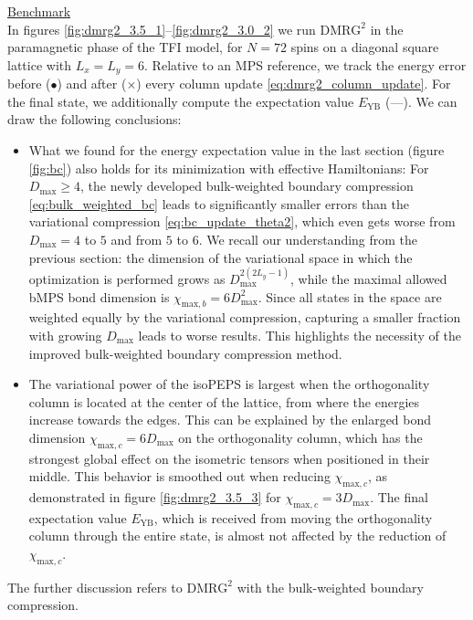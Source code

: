 \noindent \underline{Benchmark} \\[0.5em]
In figures \ref{fig:dmrg2_3.5_1}--\ref{fig:dmrg2_3.0_2} we run $\text{DMRG}^2$ in the paramagnetic phase of the TFI model, for $N = 72$ spins on a diagonal square lattice with $L_x = L_y = 6$. Relative to an MPS reference, we track the energy error before ($\bullet$) and after ($\times$) every column update \eqref{eq:dmrg2_column_update}. For the final state, we additionally compute the expectation value $E_{\text{YB}}$ (---). We can draw the following conclusions:
\begin{itemize}
	\item What we found for the energy expectation value in the last section (figure \ref{fig:bc}) also holds for its minimization with effective Hamiltonians: For $D_{\text{max}} \geq 4$, the newly developed bulk-weighted boundary compression \eqref{eq:bulk_weighted_bc} leads to significantly smaller errors than the variational compression \eqref{eq:bc_update_theta2}, which even gets worse from $D_{\text{max}} = 4$ to $5$ and from $5$ to $6$. We recall our understanding from the previous section: the dimension of the variational space in which the optimization is performed grows as $D_{\text{max}}^{2(2L_y-1)}$, while the maximal allowed bMPS bond dimension is $\chi_{\text{max}, b} = 6D_{\text{max}}^2$. Since all states in the space are weighted equally by the variational compression, capturing a smaller fraction with growing $D_{\text{max}}$ leads to worse results. This highlights the necessity of the improved bulk-weighted boundary compression method.
	\item The variational power of the isoPEPS is largest when the orthogonality column is located at the center of the lattice, from where the energies increase towards the edges. This can be explained by the enlarged bond dimension $\chi_{\text{max}, c} = 6D_{\text{max}}$ on the orthogonality column, which has the strongest global effect on the isometric tensors when positioned in their middle. This behavior is smoothed out when reducing $\chi_{\text{max}, c}$, as demonstrated in figure \ref{fig:dmrg2_3.5_3} for $\chi_{\text{max}, c} = 3D_{\text{max}}$. The final expectation value $E_{\text{YB}}$, which is received from moving the orthogonality column through the entire state, is almost not affected by the reduction of $\chi_{\text{max}, c}$.
\end{itemize}
\noindent The further discussion refers to $\text{DMRG}^2$ with the bulk-weighted boundary compression.
